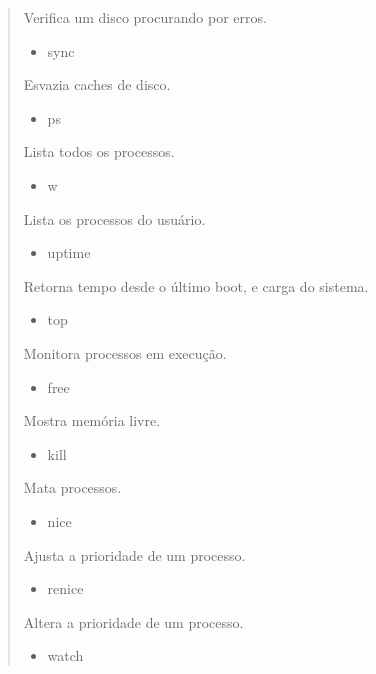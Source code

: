 \documentclass[a4paper,10pt,portuguese]{sphinxmanual}
\begin{document}
\begin{quote}
\begin{description}
\begin{itemize}
\end{itemize}

Verifica um disco procurando por erros.
\begin{itemize}
\item {} 
sync

\end{itemize}

Esvazia caches de disco.
\begin{itemize}
\item {} 
ps

\end{itemize}

Lista todos os processos.
\begin{itemize}
\item {} 
w

\end{itemize}

Lista os processos do usuário.
\begin{itemize}
\item {} 
uptime

\end{itemize}

Retorna tempo desde o último boot, e carga do sistema.
\begin{itemize}
\item {} 
top

\end{itemize}

Monitora processos em execução.
\begin{itemize}
\item {} 
free

\end{itemize}

Mostra memória livre.
\begin{itemize}
\item {} 
kill

\end{itemize}

Mata processos.
\begin{itemize}
\item {} 
nice

\end{itemize}

Ajusta a prioridade de um processo.
\begin{itemize}
\item {} 
renice

\end{itemize}

Altera a prioridade de um processo.
\begin{itemize}
\item {} 
watch


\end{itemize}
\end{description}
\end{quote}
\end{document}
